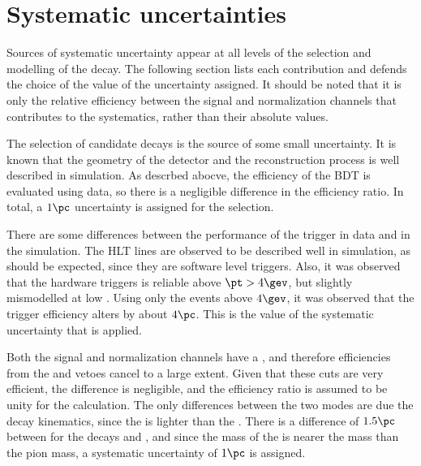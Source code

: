 \section{Systematic uncertainties}
\label{sec:dsphi:syst}

Sources of systematic uncertainty appear at all levels of the selection and modelling of the decay.
The following section lists each contribution and defends the choice of the value of the
uncertainty assigned.
It should be noted that it is only the relative efficiency between the signal and normalization
channels that contributes to the systematics, rather than their absolute values.

The selection of candidate \btodsphi decays is the source of some small uncertainty.
It is known that the geometry of the detector and the reconstruction process is well described in
simulation.
As descrbed abocve, the efficiency of the BDT is evaluated using data, so there is a negligible
difference in the efficiency ratio.
In total, a $1\pc$ uncertainty is assigned for the selection.

There are some differences between the performance of the trigger in data and in the simulation.
The HLT lines are observed to be described well in simulation, as should be expected, since they
are software level triggers.
Also, it was observed that the \lone hardware triggers is reliable above $\pt>4\gev$, but slightly
mismodelled at low \pt.
Using only the events above $4\gev$, it was observed that the trigger efficiency alters by about
$4\pc$.
This is the value of the systematic uncertainty that is applied.

Both the signal and normalization channels have a \Ds, and therefore efficiencies from the \Dp and
\Lc vetoes cancel to a large extent.
Given that these cuts are very efficient, the difference is negligible, and the efficiency ratio is
assumed to be unity for the calculation.
The only differences between the two modes are due the decay kinematics, since the \phii is lighter
than the \Dz.
There is a difference of $1.5\pc$ between  for the decays \decay{\Bsb}{\Dsp\pim} and
\btodsd, and
since the mass of the \phii is nearer the \Dz mass than the pion mass, a systematic uncertainty of
$1\pc$ is assigned.


